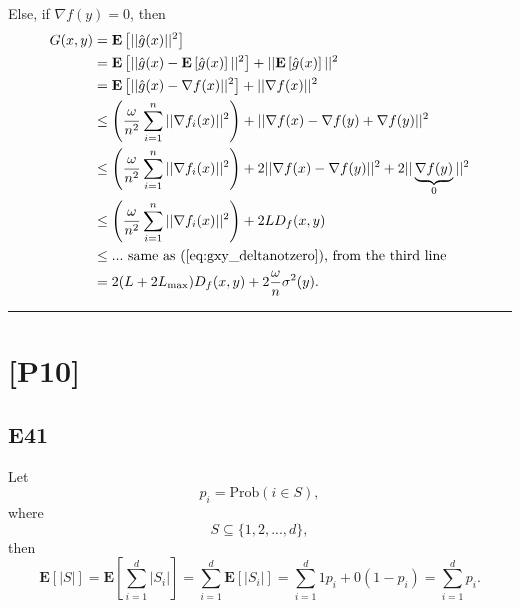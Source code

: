 \documentclass[12pt]{article}
\begin{document}
Else, if $\nabla f(y) = 0$, then
\begin{equation}
    \begin{split}
        G(x, y) &= \mathbf{E}\left[ ||\hat{g}(x)||^2 \right] \\
                &= \mathbf{E}\left[ ||\hat{g}(x) - \mathbf{E}\left[ \hat{g}(x) \right]||^2 \right] + ||\mathbf{E}\left[ \hat{g}(x) \right]||^2 \\
                &= \mathbf{E}\left[ ||\hat{g}(x) - \nabla f(x)||^2 \right] + || \nabla f(x)||^2\\
                &\leq \left(\frac{\omega}{n^2} \sum_{i=1}^n ||\nabla f_i(x)||^2 \right) + || \nabla f(x) - \nabla f(y) + \nabla f(y)||^2 \\
                &\leq \left(\frac{\omega}{n^2} \sum_{i=1}^n ||\nabla f_i(x)||^2 \right) + 2|| \nabla f(x) - \nabla f(y)||^2 + 2|| \underbrace{\nabla f(y)}_{0}||^2\\
                &\leq \left(\frac{\omega}{n^2} \sum_{i=1}^n ||\nabla f_i(x)||^2 \right) + 2LD_f(x,y)  \\
                &\leq ... \text{ same as (\ref{eq:gxy_deltanotzero}), from the third line} \\
                &= 2(L + 2L_{\text{max}})D_f(x,y) + 2 \frac{\omega}{n} \sigma^2(y).
    \end{split}
\end{equation}

\hrule
\vspace{0.1cm}
\section*{[P10]}
\subsection*{E41}
Let
\begin{equation*}
    p_i = \text{Prob}(i \in S),
\end{equation*}
where
\begin{equation*}
    S \subseteq \{1,2,...,d\},
\end{equation*}
then
\begin{equation*}
    \mathbf{E}[|S|] = \mathbf{E}\left[\sum_{i=1}^d |S_i|\right] = \sum_{i=1}^d \mathbf{E}[|S_i|] = \sum_{i=1}^d 1p_i + 0(1-p_i) = \sum_{i=1}^d p_i.
\end{equation*}
\end{document}
